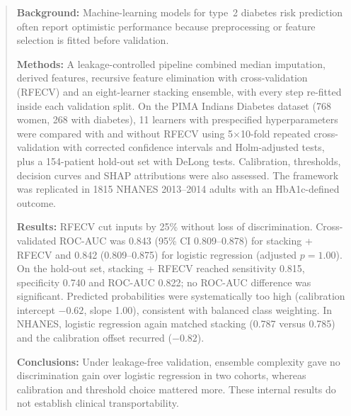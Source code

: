 \begin{abstract}
\noindent\textbf{Background:} Machine-learning models for type~2 diabetes risk prediction often report optimistic performance because preprocessing or feature selection is fitted before validation.

\noindent\textbf{Methods:} A leakage-controlled pipeline combined median imputation, derived features, recursive feature elimination with cross-validation (RFECV) and an eight-learner stacking ensemble, with every step re-fitted inside each validation split. On the PIMA Indians Diabetes dataset (768 women, 268 with diabetes), 11 learners with prespecified hyperparameters were compared with and without RFECV using 5$\times$10-fold repeated cross-validation with corrected confidence intervals and Holm-adjusted tests, plus a 154-patient hold-out set with DeLong tests. Calibration, thresholds, decision curves and SHAP attributions were also assessed. The framework was replicated in 1815 NHANES 2013--2014 adults with an HbA1c-defined outcome.

\noindent\textbf{Results:} RFECV cut inputs by 25\% without loss of discrimination. Cross-validated ROC-AUC was 0.843 (95\% CI 0.809--0.878) for stacking + RFECV and 0.842 (0.809--0.875) for logistic regression (adjusted $p = 1.00$). On the hold-out set, stacking + RFECV reached sensitivity 0.815, specificity 0.740 and ROC-AUC 0.822; no ROC-AUC difference was significant. Predicted probabilities were systematically too high (calibration intercept $-0.62$, slope 1.00), consistent with balanced class weighting. In NHANES, logistic regression again matched stacking (0.787 versus 0.785) and the calibration offset recurred ($-0.82$).

\noindent\textbf{Conclusions:} Under leakage-free validation, ensemble complexity gave no discrimination gain over logistic regression in two cohorts, whereas calibration and threshold choice mattered more. These internal results do not establish clinical transportability.
\end{abstract}
